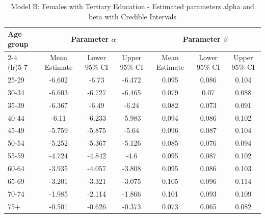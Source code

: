 \begin{landscape}
\begin{table}[htbp]
\centering
\caption{Model B: Females with Tertiary Education - Estimated parameters alpha and beta  with Credible Intervals}
\label{tab:parameters_ab12}
\begin{tabular}{@{}lcccccc@{}}
\toprule
Age group & \multicolumn{3}{c}{Parameter \(\alpha\)} & \multicolumn{3}{c}{Parameter \(\beta\)} \\ 
\cmidrule(lr){2-4} \cmidrule(lr){5-7}
          & Mean Estimate & Lower 95\% CI & Upper 95\% CI & Mean Estimate & Lower 95\% CI & Upper 95\% CI \\ 
\midrule
25-29 & -6.602 & -6.73 & -6.472 & 0.095 & 0.086 & 0.104 \\
30-34 & -6.603 & -6.727 & -6.465 & 0.079 & 0.07 & 0.088 \\
35-39 & -6.367 & -6.49 & -6.24 & 0.082 & 0.073 & 0.091 \\
40-44 & -6.11 & -6.233 & -5.983 & 0.094 & 0.086 & 0.102 \\
45-49 & -5.759 & -5.875 & -5.64 & 0.096 & 0.087 & 0.104 \\
50-54 & -5.252 & -5.367 & -5.126 & 0.085 & 0.076 & 0.094 \\
55-59 & -4.724 & -4.842 & -4.6 & 0.095 & 0.087 & 0.102 \\
60-64 & -3.935 & -4.057 & -3.808 & 0.095 & 0.086 & 0.103 \\
65-69 & -3.201 & -3.321 & -3.075 & 0.105 & 0.096 & 0.114 \\
70-74 & -1.985 & -2.114 & -1.866 & 0.101 & 0.093 & 0.109 \\
75+ & -0.501 & -0.626 & -0.373 & 0.073 & 0.065 & 0.082 \\
\bottomrule
\end{tabular}
\end{table}
\end{landscape}